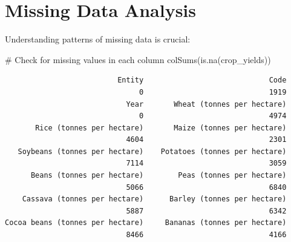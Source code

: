 \documentclass[
  letterpaper,
]{book}
\newenvironment{Shaded}{\begin{snugshade}}{\end{snugshade}}
\newcommand{\CommentTok}[1]{\textcolor[rgb]{0.37,0.37,0.37}{#1}}
\newcommand{\FunctionTok}[1]{\textcolor[rgb]{0.28,0.35,0.67}{#1}}
\newcommand{\NormalTok}[1]{\textcolor[rgb]{0.00,0.23,0.31}{#1}}
\begin{document}
\section{Missing Data Analysis}\label{missing-data-analysis}

Understanding patterns of missing data is crucial:

\begin{Shaded}
\begin{Highlighting}[]
\CommentTok{\# Check for missing values in each column}
\FunctionTok{colSums}\NormalTok{(}\FunctionTok{is.na}\NormalTok{(crop\_yields))}
\end{Highlighting}
\end{Shaded}

\begin{verbatim}
                          Entity                             Code 
                               0                             1919 
                            Year       Wheat (tonnes per hectare) 
                               0                             4974 
       Rice (tonnes per hectare)       Maize (tonnes per hectare) 
                            4604                             2301 
   Soybeans (tonnes per hectare)    Potatoes (tonnes per hectare) 
                            7114                             3059 
      Beans (tonnes per hectare)        Peas (tonnes per hectare) 
                            5066                             6840 
    Cassava (tonnes per hectare)      Barley (tonnes per hectare) 
                            5887                             6342 
Cocoa beans (tonnes per hectare)     Bananas (tonnes per hectare) 
                            8466                             4166 
\end{verbatim}
\end{document}
